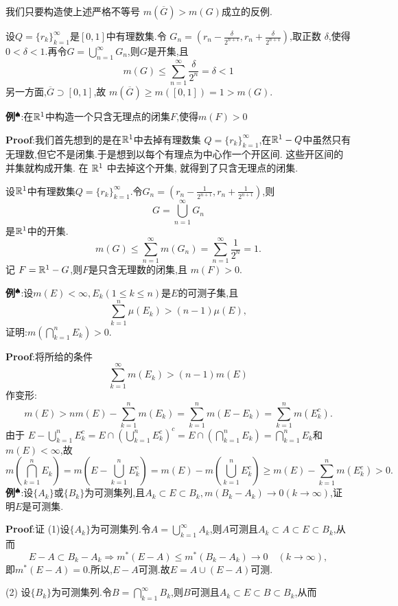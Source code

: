 我们只要构造使上述严格不等号 $m(\overline{G}) > m(G)$成立的反例.\par
设$Q =\{r_k\}_{k=1}^{\infty}$是$[0,1]$中有理数集.令 $G_n =\left( r_n - \frac{\delta}{2^{n+1}}, r_n + \frac{\delta}{2^{n+1}} \right)$,取正数 $\delta$,使得$0 < \delta < 1$.再令$G = \bigcup_{n=1}^{\infty} G_n$,则$G$是开集,且
$$
m(G) \leqslant \sum_{n=1}^{\infty} \frac{\delta}{2^n} = \delta < 1
$$
另一方面,$\overline{G} \supset [0,1]$,故 $m(\overline{G}) \geqslant m([0,1]) = 1 > m(G)$.\par
\textbf{例}$^\spadesuit$:在$\mathbb{R} ^1$中构造一个只含无理点的闭集$F$,使得$m(F)>0$\par
\textbf{Proof}:我们首先想到的是在$\mathbb{R}^1$中去掉有理数集 $Q=\{r_k\}_{k=1}^\infty$,在$\mathbb{R}^1 - Q$中虽然只有无理数,但它不是闭集.于是想到以每个有理点为中心作一个开区间. 这些开区间的并集就构成开集. 在 $\mathbb{R}^1$ 中去掉这个开集, 就得到了只含无理点的闭集.\par
设$\mathbb{R}^1$中有理数集$Q=\{r_k\}_{k=1}^\infty$.令$G_n=\left(r_n-\frac{1}{2^{n+1}}, r_n+\frac{1}{2^{n+1}}\right)$,则
$$
G=\bigcup_{n=1}^\infty G_n
$$
是$\mathbb{R}^1$中的开集. 
$$
m(G)\leqslant\sum_{n=1}^\infty m(G_n) =\sum_{n=1}^\infty \frac{1}{2^n} = 1.
$$
记 $F=\mathbb{R}^1 - G$,则$F$是只含无理数的闭集,且 $m(F) > 0$.\par
\textbf{例}$^\spadesuit$:设$m(E)<\infty,E_{k}(1\leqslant k\leqslant n)$是$E$的可测子集,且  
$$
\sum_{k=1}^{n}\mu\left(E_{k}\right)>\left(n-1\right)\mu\left(E\right),
$$  
证明:$m\left(\bigcap_{k=1}^{n}E_{k}\right)>0$.\par
\textbf{Proof}:将所给的条件 
$$
\sum_{k=1}^{\infty} m(E_k) > (n-1) m(E)
$$
作变形:
$$
m(E) > n m(E) -\sum_{k=1}^{n} m(E_k) =\sum_{k=1}^{n} m(E - E_k) =\sum_{k=1}^{n} m(E_k^c).
$$
由于 $E -\bigcup_{k=1}^{n} E_k^c = E\cap \left( \bigcup_{k=1}^{n} E_k^c \right)^c = E \cap \left( \bigcap_{k=1}^{n} E_k \right) = \bigcap_{k=1}^{n} E_k$和$m(E) < \infty$,故
$$
m \left(\bigcap_{k=1}^{n} E_k \right) = m\left( E - \bigcup_{k=1}^{n} E_k^c \right) = m(E) - m \left( \bigcup_{k=1}^{n} E_k^c \right) \geqslant m(E) - \sum_{k=1}^{n} m(E_k^c) > 0.
$$
\qquad \textbf{例}$^\spadesuit$:设$\{A_{k}\}$或$\{B_{k}\}$为可测集列,且$A_{k}\subset E\subset B_{k},m(B_{k}-A_{k})\to 0(k\to\infty)$,证明$E$是可测集.\par
\textbf{Proof}:证 (1)设$\{A_k\}$为可测集列.令$A=\bigcup_{k=1}^{\infty}A_k$,则$A$可测且$A_k\subset A\subset E\subset B_k$,从而
$$
E-A\subset B_k-A_k \Rightarrow m^*(E-A)\leqslant m^*(B_k-A_k)\to 0 \quad (k\to\infty),
$$
即$m^*(E-A)=0$.所以,$E-A$可测.故$E=A\cup(E-A)$可测.\par
(2) 设$\{B_k\}$为可测集列.令$B=\bigcap_{k=1}^{\infty}B_k$,则$B$可测且$A_k\subset E\subset B\subset B_k$,从而

